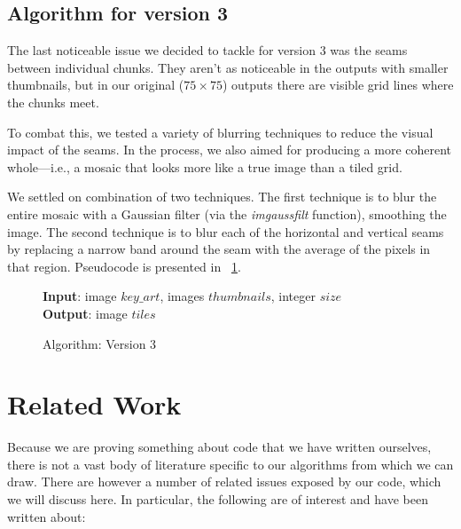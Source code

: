 \documentclass[11pt,conference]{IEEEtran}
\begin{document}
\subsection{Algorithm for version 3}\label{S:algv3}

The last noticeable issue we decided to tackle for version 3 was the seams
between individual chunks. They aren't as noticeable in the outputs with smaller
thumbnails, but in our original (\(75 \times 75\)) outputs there are visible
grid lines where the chunks meet.

To combat this, we tested a variety of blurring techniques to reduce the visual
impact of the seams. In the process, we also aimed for producing a more coherent
whole---i.e., a mosaic that looks more like a true image than a tiled grid.

We settled on combination of two techniques. The first technique is to blur the
entire mosaic with a Gaussian filter (via the \textit{imgaussfilt} function),
smoothing the image. The second technique is to blur each of the horizontal and
vertical seams by replacing a narrow band around the seam with the average of
the pixels in that region. Pseudocode is presented in \figurename~\ref{alg:v3}.

\begin{figure}[!t]
    \textbf{Input}: image \(key\_art\), images \(thumbnails\), integer \(size\) \\
    \textbf{Output}: image \(tiles\)
    \begin{algorithmic}
        \STATE{}
        \STATE{}
        \ENDFOR
        \ENDFOR
    \end{algorithmic}
    \caption{Algorithm: Version 3}\label{alg:v3}
\end{figure}

\section{Related Work}

Because we are proving something about code that we have written ourselves,
there is not a vast body of literature specific to our algorithms from which we
can draw. There are however a number of related issues exposed by our code,
which we will discuss here. In particular, the following are of interest and
have been written about:
\end{document}
